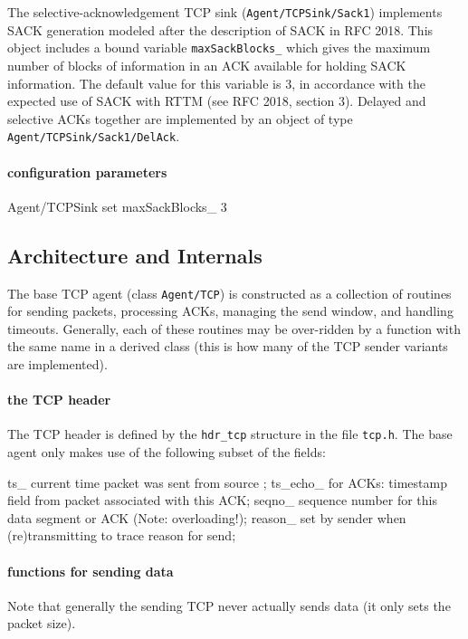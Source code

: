 \documentclass{article}
\begin{document}
The selective-acknowledgement TCP sink ({\tt Agent/TCPSink/Sack1}) implements
SACK generation modeled after the description of SACK in RFC 2018.
This object includes a bound variable {\tt maxSackBlocks\_} which gives
the maximum number of blocks of information in an ACK available for
holding SACK information.
The default value for this variable is 3, in accordance with the expected
use of SACK with RTTM (see RFC 2018, section 3).
Delayed and selective ACKs together are implemented by
an object of type {\tt Agent/TCPSink/Sack1/DelAck}.

\paragraph{configuration parameters}
\begin{program}
Agent/TCPSink set maxSackBlocks_ 3
\end{program}

\subsection{Architecture and Internals}
\label{sec:tcparchitecture}

The base TCP agent (class {\tt Agent/TCP}) is constructed
as a collection of routines for sending packets, processing ACKs,
managing the send window, and handling timeouts.
Generally, each of these routines may be over-ridden by a
function with the same name in a derived class (this is how
many of the TCP sender variants are implemented).

\paragraph{the TCP header}
The TCP header is defined by the {\tt hdr\_tcp} structure
in the file {\tt tcp.h}.
The base agent only makes use of the following subset of the fields:
\begin{program}
ts_	\*current time packet was sent from source ;
ts_echo_ \*for ACKs: timestamp field from packet associated with this ACK;
seqno_ \* sequence number for this data segment or ACK (Note: overloading!);
reason_ \* set by sender when (re)transmitting to trace reason for send;
\end{program}

\paragraph{functions for sending data}
Note that generally the sending TCP never actually sends
data (it only sets the packet size).
\end{document}
